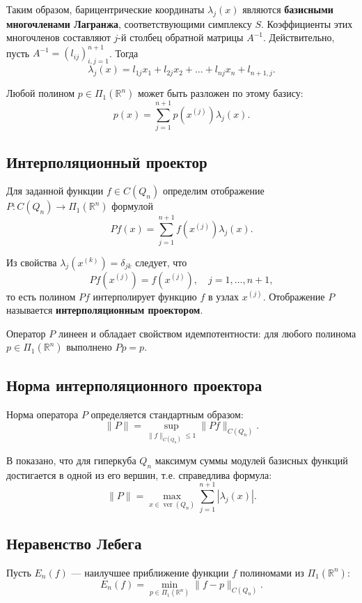 \documentclass[main]{subfiles}
\begin{document}
Таким образом, барицентрические координаты $\lambda_j(x)$ являются \textbf{базисными многочленами Лагранжа}, соответствующими симплексу $S$. Коэффициенты этих многочленов составляют $j$-й столбец обратной матрицы $A^{-1}$. Действительно, пусть $A^{-1} = (l_{ij})_{i,j=1}^{n+1}$. Тогда
\[
\lambda_j(x) = l_{1j} x_1 + l_{2j} x_2 + \dots + l_{nj} x_n + l_{n+1,j}.
\]

Любой полином $p \in \Pi_1(\mathbb{R}^n)$ может быть разложен по этому базису:
\[
p(x) = \sum_{j=1}^{n+1} p(x^{(j)}) \lambda_j(x). \tag{1}
\]

\subsection{Интерполяционный проектор}

Для заданной функции $f \in C(Q_n)$ определим отображение $P: C(Q_n) \to \Pi_1(\mathbb{R}^n)$ формулой
\[
P f(x) = \sum_{j=1}^{n+1} f(x^{(j)}) \lambda_j(x). \tag{2}
\]

Из свойства $\lambda_j(x^{(k)}) = \delta_{jk}$ следует, что
\[
P f(x^{(j)}) = f(x^{(j)}), \quad j = 1, \dots, n+1,
\]
то есть полином $P f$ интерполирует функцию $f$ в узлах $x^{(j)}$. Отображение $P$ называется \textbf{интерполяционным проектором}.

Оператор $P$ линеен и обладает свойством идемпотентности: для любого полинома $p \in \Pi_1(\mathbb{R}^n)$ выполнено $P p = p$.

\subsection{Норма интерполяционного проектора}

Норма оператора $P$ определяется стандартным образом:
\[
\|P\| = \sup_{\|f\|_{C(Q_n)} \le 1} \|P f\|_{C(Q_n)}.
\]

В \cite{nevsky_geo} показано, что для гиперкуба $Q_n$ максимум суммы модулей базисных функций достигается в одной из его вершин, т.е. справедлива формула:
\[
\|P\| = \max_{x \in \operatorname{ver}(Q_n)} \sum_{j=1}^{n+1} |\lambda_j(x)|. \tag{3}
\]

\subsection{Неравенство Лебега}

Пусть $E_n(f)$ — наилучшее приближение функции $f$ полиномами из $\Pi_1(\mathbb{R}^n)$:
\[
E_n(f) = \min_{p \in \Pi_1(\mathbb{R}^n)} \|f - p\|_{C(Q_n)}.
\]
\end{document}
